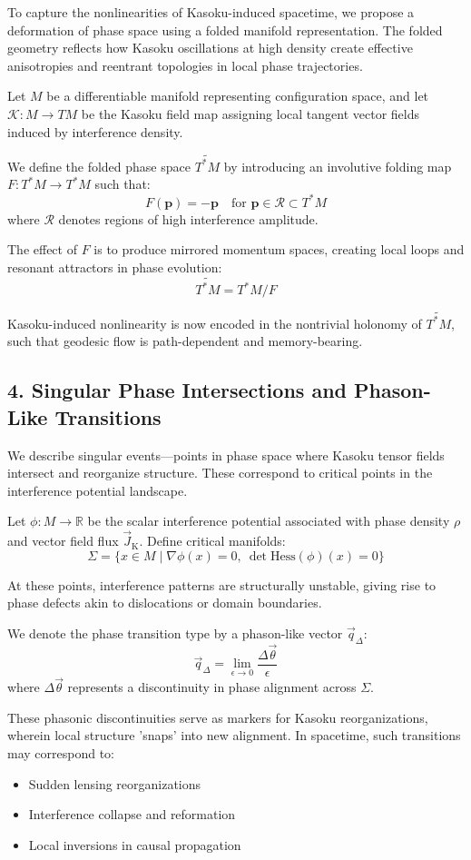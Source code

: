 To capture the nonlinearities of Kasoku-induced spacetime, we propose a deformation of phase space using a folded manifold representation. The folded geometry reflects how Kasoku oscillations at high density create effective anisotropies and reentrant topologies in local phase trajectories.

Let $M$ be a differentiable manifold representing configuration space, and let $\mathcal{K} : M \to TM$ be the Kasoku field map assigning local tangent vector fields induced by interference density.

We define the folded phase space $\widetilde{T^*M}$ by introducing an involutive folding map $F : T^*M \to T^*M$ such that:
\[
F(\mathbf{p}) = -\mathbf{p} \quad \text{for } \mathbf{p} \in \mathcal{R} \subset T^*M
\]
where $\mathcal{R}$ denotes regions of high interference amplitude.

The effect of $F$ is to produce mirrored momentum spaces, creating local loops and resonant attractors in phase evolution:
\[
\widetilde{T^*M} = T^*M / F
\]

Kasoku-induced nonlinearity is now encoded in the nontrivial holonomy of $\widetilde{T^*M}$, such that geodesic flow is path-dependent and memory-bearing.

\subsection*{4. Singular Phase Intersections and Phason-Like Transitions}

We describe singular events—points in phase space where Kasoku tensor fields intersect and reorganize structure. These correspond to critical points in the interference potential landscape.

Let $\phi : M \to \mathbb{R}$ be the scalar interference potential associated with phase density $\rho$ and vector field flux $\vec{J}_\text{K}$. Define critical manifolds:
\[
\Sigma = \{ x \in M \mid \nabla \phi(x) = 0,\ \det \text{Hess}(\phi)(x) = 0 \}
\]

At these points, interference patterns are structurally unstable, giving rise to phase defects akin to dislocations or domain boundaries.

We denote the phase transition type by a phason-like vector $\vec{q}_\Delta$:
\[
\vec{q}_\Delta = \lim_{\epsilon \to 0} \frac{\Delta \vec{\theta}}{\epsilon}
\]
where $\Delta \vec{\theta}$ represents a discontinuity in phase alignment across $\Sigma$.

These phasonic discontinuities serve as markers for Kasoku reorganizations, wherein local structure 'snaps' into new alignment. In spacetime, such transitions may correspond to:
\begin{itemize}
  \item Sudden lensing reorganizations
  \item Interference collapse and reformation
  \item Local inversions in causal propagation
\end{itemize}

